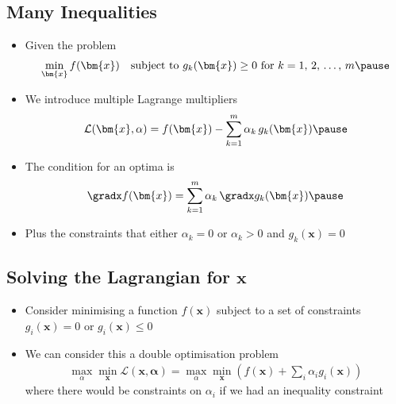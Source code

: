 \begin{slide}
\section[-2]{Many Inequalities}

\begin{PauseHighLight}
  \begin{itemize}
  \item Given the problem
    \begin{align*}
      \min_{\bm{x}} f(\bm{x}) \quad \mbox{subject to $g_k(\bm{x})\geq 0$ for
      $k=1,\,2,\,\ldots,\,m$}\pause
    \end{align*}
  \item We introduce multiple Lagrange multipliers
    \begin{align*}
      \mathcal{L}(\bm{x},\alpha) = f(\bm{x}) - \sum_{k=1}^m \alpha_k\,
      g_k(\bm{x})\pause 
    \end{align*}
  \item The condition for an optima is
    \begin{align*}
      \gradx f(\bm{x}) = \sum_{k=1}^m  \alpha_k \, \gradx g_k(\bm{x})\pause
    \end{align*}
  \item Plus the constraints that either $\alpha_k=0$ or $\alpha_k>0$ and
    $g_k(\bm{x})=0$\pause
  \end{itemize}
\end{PauseHighLight}

\end{slide}


\Outline %

\begin{slide}
\section{Solving the Lagrangian for $\bm{x}$}

\begin{PauseHighLight}
  \begin{itemize}
  \item Consider minimising a function $f(\bm{x})$ subject to a set of
    constraints $g_i(\bm{x})=0$ or $g_i(\bm{x})\leq 0$\pause
  \item We can consider this a double optimisation problem
    \begin{align*}
      \max_\alpha \min_{\bm{x}} \mathcal{L}(\bm{x},\bm{\alpha})
      = \max_\alpha \min_{\bm{x}} \left( f(\bm{x}) + \sum_i \alpha_i
      g_i(\bm{x}) \right)
    \end{align*}
    where there would be constraints on $\alpha_i$ if we had an
    inequality constraint\pause
  \end{itemize}
\end{PauseHighLight}

\end{slide}

